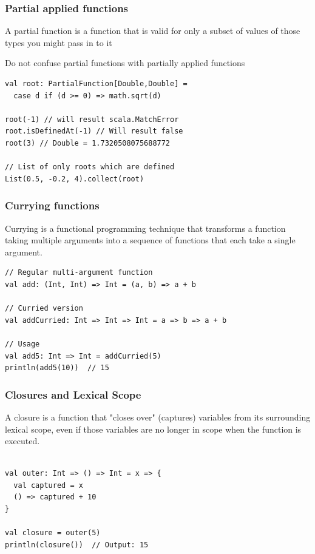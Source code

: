 \documentclass{beamer}
\begin{document}
\begin{frame}[fragile]
\frametitle{Partial applied functions}

A partial function is a function that is valid for only a subset of values of those types you might pass in to it


Do not confuse partial functions with partially applied functions
\begin{lstlisting}[style=scalaStyle]
val root: PartialFunction[Double,Double] = 
  case d if (d >= 0) => math.sqrt(d)

root(-1) // will result scala.MatchError
root.isDefinedAt(-1) // Will result false
root(3) // Double = 1.7320508075688772 

// List of only roots which are defined
List(0.5, -0.2, 4).collect(root) 

\end{lstlisting}
\end{frame}



\begin{frame}[fragile]
\frametitle{Currying functions}

Currying is a functional programming technique that transforms a function taking multiple arguments into a sequence of functions that each take a single argument. 

\begin{lstlisting}[style=scalaStyle]
// Regular multi-argument function
val add: (Int, Int) => Int = (a, b) => a + b

// Curried version
val addCurried: Int => Int => Int = a => b => a + b

// Usage
val add5: Int => Int = addCurried(5)
println(add5(10))  // 15

\end{lstlisting}
\end{frame}



\begin{frame}[fragile]
\frametitle{Closures and Lexical Scope}

A closure is a function that "closes over" (captures) variables from its surrounding lexical scope, even if those variables are no longer in scope when the function is executed.

\begin{lstlisting}[style=scalaStyle]

val outer: Int => () => Int = x => {
  val captured = x
  () => captured + 10
}

val closure = outer(5)
println(closure())  // Output: 15

\end{lstlisting}
\end{frame}
\end{document}
